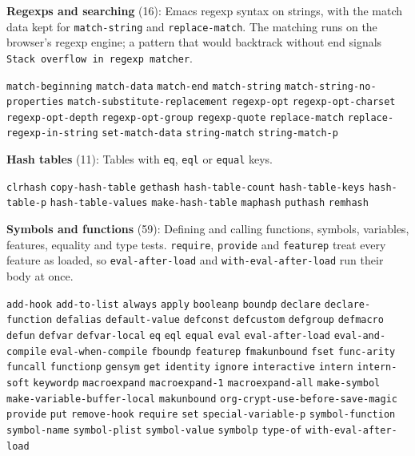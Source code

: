 \documentclass[11pt]{article}
\begin{document}
\textbf{Regexps and searching} (16): Emacs regexp syntax on strings, with the match data kept for \texttt{match-string} and \texttt{replace-match}. The matching runs on the browser's regexp engine; a pattern that would backtrack without end signals \texttt{Stack overflow in regexp matcher}.

\texttt{match-beginning} \texttt{match-data} \texttt{match-end} \texttt{match-string} \texttt{match-string-no-properties} \texttt{match-substitute-replacement} \texttt{regexp-opt} \texttt{regexp-opt-charset} \texttt{regexp-opt-depth} \texttt{regexp-opt-group} \texttt{regexp-quote} \texttt{replace-match} \texttt{replace-regexp-in-string} \texttt{set-match-data} \texttt{string-match} \texttt{string-match-p}

\textbf{Hash tables} (11): Tables with \texttt{eq}, \texttt{eql} or \texttt{equal} keys.

\texttt{clrhash} \texttt{copy-hash-table} \texttt{gethash} \texttt{hash-table-count} \texttt{hash-table-keys} \texttt{hash-table-p} \texttt{hash-table-values} \texttt{make-hash-table} \texttt{maphash} \texttt{puthash} \texttt{remhash}

\textbf{Symbols and functions} (59): Defining and calling functions, symbols, variables, features, equality and type tests. \texttt{require}, \texttt{provide} and \texttt{featurep} treat every feature as loaded, so \texttt{eval-after-load} and \texttt{with-eval-after-load} run their body at once.

\texttt{add-hook} \texttt{add-to-list} \texttt{always} \texttt{apply} \texttt{booleanp} \texttt{boundp} \texttt{declare} \texttt{declare-function} \texttt{defalias} \texttt{default-value} \texttt{defconst} \texttt{defcustom} \texttt{defgroup} \texttt{defmacro} \texttt{defun} \texttt{defvar} \texttt{defvar-local} \texttt{eq} \texttt{eql} \texttt{equal} \texttt{eval} \texttt{eval-after-load} \texttt{eval-and-compile} \texttt{eval-when-compile} \texttt{fboundp} \texttt{featurep} \texttt{fmakunbound} \texttt{fset} \texttt{func-arity} \texttt{funcall} \texttt{functionp} \texttt{gensym} \texttt{get} \texttt{identity} \texttt{ignore} \texttt{interactive} \texttt{intern} \texttt{intern-soft} \texttt{keywordp} \texttt{macroexpand} \texttt{macroexpand-1} \texttt{macroexpand-all} \texttt{make-symbol} \texttt{make-variable-buffer-local} \texttt{makunbound} \texttt{org-crypt-use-before-save-magic} \texttt{provide} \texttt{put} \texttt{remove-hook} \texttt{require} \texttt{set} \texttt{special-variable-p} \texttt{symbol-function} \texttt{symbol-name} \texttt{symbol-plist} \texttt{symbol-value} \texttt{symbolp} \texttt{type-of} \texttt{with-eval-after-load}
\end{document}
